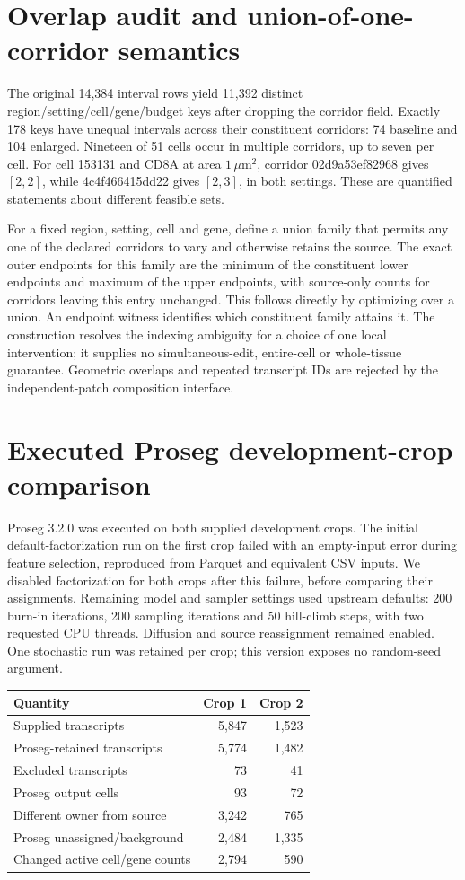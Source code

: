 \documentclass[10pt,letterpaper]{article}
\begin{document}
\section{Overlap audit and union-of-one-corridor semantics}
The original 14,384 interval rows yield 11,392 distinct region/setting/cell/gene/budget keys after dropping the corridor field. Exactly 178 keys have unequal intervals across their constituent corridors: 74 baseline and 104 enlarged. Nineteen of 51 cells occur in multiple corridors, up to seven per cell. For cell 153131 and CD8A at area $1\,\mu$m$^2$, corridor 02d9a53ef82968 gives $[2,2]$, while 4c4f466415dd22 gives $[2,3]$, in both settings. These are quantified statements about different feasible sets.

For a fixed region, setting, cell and gene, define a union family that permits any one of the declared corridors to vary and otherwise retains the source. The exact outer endpoints for this family are the minimum of the constituent lower endpoints and maximum of the upper endpoints, with source-only counts for corridors leaving this entry unchanged. This follows directly by optimizing over a union. An endpoint witness identifies which constituent family attains it. The construction resolves the indexing ambiguity for a choice of one local intervention; it supplies no simultaneous-edit, entire-cell or whole-tissue guarantee. Geometric overlaps and repeated transcript IDs are rejected by the independent-patch composition interface.

\section{Executed Proseg development-crop comparison}
Proseg 3.2.0 \cite{proseg} was executed on both supplied development crops. The initial default-factorization run on the first crop failed with an empty-input error during feature selection, reproduced from Parquet and equivalent CSV inputs. We disabled factorization for both crops after this failure, before comparing their assignments. Remaining model and sampler settings used upstream defaults: 200 burn-in iterations, 200 sampling iterations and 50 hill-climb steps, with two requested CPU threads. Diffusion and source reassignment remained enabled. One stochastic run was retained per crop; this version exposes no random-seed argument.

\begin{center}
\begin{tabular}{lrr}\toprule
Quantity & Crop 1 & Crop 2\\\midrule
Supplied transcripts &5,847&1,523\\
Proseg-retained transcripts &5,774&1,482\\
Excluded transcripts &73&41\\
Proseg output cells &93&72\\
Different owner from source &3,242&765\\
Proseg unassigned/background &2,484&1,335\\
Changed active cell/gene counts &2,794&590\\\bottomrule
\end{tabular}
\end{center}
\end{document}
